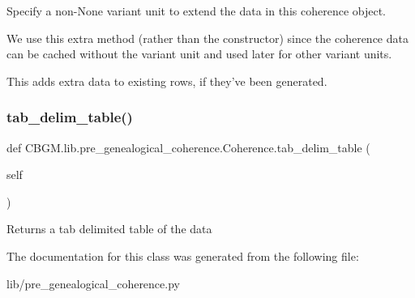 \begin{DoxyVerb}Specify a non-None variant unit to extend the data in this coherence object.

We use this extra method (rather than the constructor) since the coherence data can be cached without the
variant unit and used later for other variant units.

This adds extra data to existing rows, if they've been generated.
\end{DoxyVerb}
 \mbox{\label{classCBGM_1_1lib_1_1pre__genealogical__coherence_1_1Coherence_a977c8850361d5d9cf60d0098cdc0e4a7}} 
\subsubsection{\texorpdfstring{tab\+\_\+delim\+\_\+table()}{tab\_delim\_table()}}
{\footnotesize\ttfamily def C\+B\+G\+M.\+lib.\+pre\+\_\+genealogical\+\_\+coherence.\+Coherence.\+tab\+\_\+delim\+\_\+table (\begin{DoxyParamCaption}\item[{}]{self }\end{DoxyParamCaption})}

\begin{DoxyVerb}Returns a tab delimited table of the data
\end{DoxyVerb}
 

The documentation for this class was generated from the following file\+:\begin{DoxyCompactItemize}
\item 
lib/pre\+\_\+genealogical\+\_\+coherence.\+py\end{DoxyCompactItemize}

